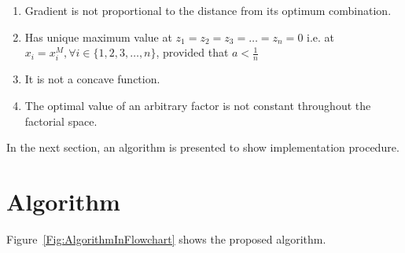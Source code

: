 \documentclass[twocolumn]{svjour3}          %
\begin{document}
\begin{enumerate}
	\item Gradient is not proportional to the distance from its optimum combination.
	\item Has unique maximum value at $z_1 = z_2 = z_3 = \dots = z_n = 0$ i.e. at $x_i=x_i^M, \forall i\in\{1, 2, 3, \dots, n\}$, provided that $a<\frac{1}{n}$
	\item It is not a concave function.
	\item The optimal value of an arbitrary factor is not constant throughout the factorial space.
\end{enumerate}
\par
In the next section, an algorithm is presented to show implementation procedure.
\section{Algorithm}
\label{Sec:Algorithm}
Figure~\ref{Fig:AlgorithmInFlowchart} shows the proposed algorithm.
\end{document}
